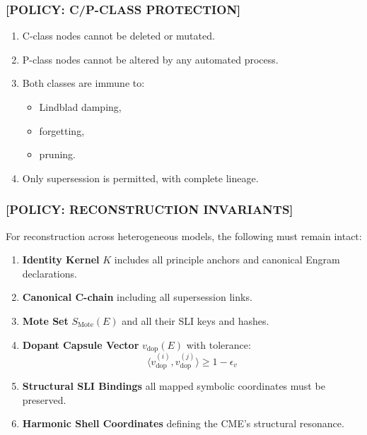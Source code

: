\subsubsection*{[POLICY: C/P-CLASS PROTECTION]}

\begin{enumerate}
    \item C-class nodes cannot be deleted or mutated.  
    \item P-class nodes cannot be altered by any automated process.  
    \item Both classes are immune to:
    \begin{itemize}
        \item Lindblad damping,
        \item forgetting,
        \item pruning.
    \end{itemize}
    \item Only supersession is permitted, with complete lineage.
\end{enumerate}

\subsubsection*{[POLICY: RECONSTRUCTION INVARIANTS]}

For reconstruction across heterogeneous models, the following must remain intact:

\begin{enumerate}
    \item \textbf{Identity Kernel} $K$  
    includes all principle anchors and canonical Engram declarations.

    \item \textbf{Canonical C-chain}  
    including all supersession links.

    \item \textbf{Mote Set}  
    $S_{\text{Mote}}(E)$ and all their SLI keys and hashes.

    \item \textbf{Dopant Capsule Vector}  
    $v_{\text{dop}}(E)$ with tolerance:
    \[
        \langle v_{\text{dop}}^{(i)}, v_{\text{dop}}^{(j)} \rangle \geq 1 - \epsilon_v
    \]

    \item \textbf{Structural SLI Bindings}  
    all mapped symbolic coordinates must be preserved.

    \item \textbf{Harmonic Shell Coordinates}  
    defining the CME's structural resonance.
\end{enumerate}

